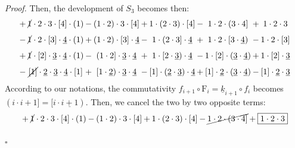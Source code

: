 \documentclass[12pt,reqno]{amsart}
\theoremstyle{article}
\renewenvironment{proof}{\noindent \textit{Proof.}} {\nolinebreak\hfill $\square$}
\def \F{\mathrm F}
\newcommand{\ul}{\underline}
\begin{document}
\begin{proof}
    Then,
    the development of $S_3$ becomes then:
    $$
    \begin{array}{c@{\hspace{2pt}}c@{\hspace{2pt}}c@{\hspace{2pt}}c@{\hspace{2pt}}c@{\hspace{2pt}}c@{\hspace{2pt}}c@{\hspace{2pt}}c@{\hspace{2pt}}c@{\hspace{2pt}}c}
      + & \cancel 1\cdot 2\cdot 3\cdot [4]\cdot(1) & - & (1\cdot 2)\cdot 3\cdot [4] & + & 1\cdot (2\cdot 3)\cdot[4] & - & 1\cdot 2\cdot (3\cdot 4]   & + & 1\cdot 2\cdot 3 \\[.25cm]
      - & \cancel 1\cdot 2\cdot [3]\cdot \ul4\cdot(1) & + & (1\cdot 2)\cdot [3]\cdot \ul4 & - & 1\cdot (2\cdot 3]\cdot\ul4   & + & 1\cdot 2\cdot [3\cdot \ul4)   & - & 1\cdot 2\cdot [3] \\[.25cm]
      + & \cancel 1\cdot [2]\cdot \ul3\cdot \ul4\cdot(1) & - & (1\cdot 2]\cdot \ul3 \cdot \ul4  & + & 1\cdot [2 \cdot \ul3)\cdot\ul4  & - & 1\cdot [2]\cdot (\ul3\cdot \ul4) & + & 1\cdot [2]\cdot \ul3 \\[.25cm]
      - & \cancel{[1]}\cdot \ul2\cdot \ul3\cdot \ul4\cdot[1] & + & [1\cdot \ul2)\cdot \ul3 \cdot \ul4  & - & [1] \cdot (\ul2 \cdot \ul3)\cdot\ul4 & + & [1]\cdot \ul2\cdot (\ul3\cdot \ul4)& - & [1]\cdot \ul2\cdot \ul3
    \end{array}
    $$
    According to our notations,
    the commutativity $f_{i+1} \circ \F_i = \ul{k}_{i+1} \circ f_i$ becomes $(i \cdot i+1] = [i\cdot \ul{i+1})$.
    Then,
    we cancel the two by two opposite terms:
    $$
    \begin{array}{c@{\hspace{2pt}}c@{\hspace{2pt}}c@{\hspace{2pt}}c@{\hspace{2pt}}c@{\hspace{2pt}}c@{\hspace{2pt}}c@{\hspace{2pt}}c@{\hspace{2pt}}c@{\hspace{2pt}}c}
      + & \cancel 1\cdot 2\cdot 3\cdot [4]\cdot(1)                     & - & (1\cdot 2)\cdot 3\cdot [4]                   & + & 1\cdot (2\cdot 3)\cdot[4]                 & - & \cancel{1\cdot 2\cdot (3\cdot 4]}    & + & \fbox{$1\cdot 2\cdot 3$} \\[.25cm]

\end{array}$$
\end{proof}
\end{document}
